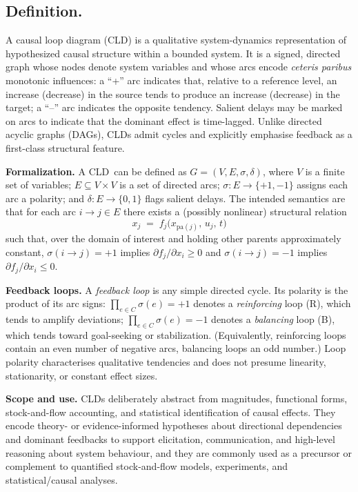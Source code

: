 \newcommand{\CLD}{CLD}
\subsection{Definition.}
A causal loop diagram (\CLD) is a qualitative system-dynamics representation of hypothesized causal structure within a bounded system. It is a signed, directed graph whose nodes denote system variables and whose arcs encode \emph{ceteris paribus} monotonic influences: a \enquote{+} arc indicates that, relative to a reference level, an increase (decrease) in the source tends to produce an increase (decrease) in the target; a \enquote{--} arc indicates the opposite tendency. Salient delays may be marked on arcs to indicate that the dominant effect is time-lagged. Unlike directed acyclic graphs (DAGs), CLDs admit cycles and explicitly emphasise feedback as a first-class structural feature.

\medskip
\noindent
\textbf{Formalization.} A \CLD\ can be defined as \(G=(V,E,\sigma,\delta)\), where \(V\) is a finite set of variables; \(E\subseteq V\times V\) is a set of directed arcs; \(\sigma:E\rightarrow\{+1,-1\}\) assigns each arc a polarity; and \(\delta:E\rightarrow\{0,1\}\) flags salient delays. The intended semantics are that for each arc \(i\rightarrow j\in E\) there exists a (possibly nonlinear) structural relation
\[
x_j \;=\; f_j\!\bigl(x_{\mathrm{pa}(j)},\,u_j,\,t\bigr)
\]
such that, over the domain of interest and holding other parents approximately constant, \(\sigma(i\rightarrow j)=+1\) implies \(\partial f_j/\partial x_i \ge 0\) and \(\sigma(i\rightarrow j)=-1\) implies \(\partial f_j/\partial x_i \le 0\).

\medskip
\noindent
\textbf{Feedback loops.} A \emph{feedback loop} is any simple directed cycle. Its polarity is the product of its arc signs: \(\prod_{e\in C}\sigma(e)=+1\) denotes a \emph{reinforcing} loop (R), which tends to amplify deviations; \(\prod_{e\in C}\sigma(e)=-1\) denotes a \emph{balancing} loop (B), which tends toward goal-seeking or stabilization. (Equivalently, reinforcing loops contain an even number of negative arcs, balancing loops an odd number.) Loop polarity characterises qualitative tendencies and does not presume linearity, stationarity, or constant effect sizes.

\medskip
\noindent
\textbf{Scope and use.} \CLD s deliberately abstract from magnitudes, functional forms, stock-and-flow accounting, and statistical identification of causal effects. They encode theory- or evidence-informed hypotheses about directional dependencies and dominant feedbacks to support elicitation, communication, and high-level reasoning about system behaviour, and they are commonly used as a precursor or complement to quantified stock-and-flow models, experiments, and statistical/causal analyses.

